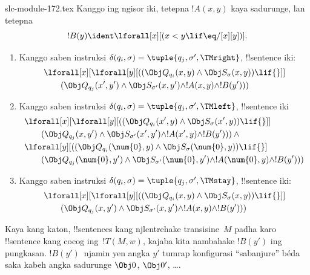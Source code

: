 \begin{filecontents*}[overwrite]{slc-module-172.tex}
Kanggo ing ngisor iki, tetepna $!A(x, y)$ kaya
sadurunge, lan tetepna
\[
  !B(y) \ident \lforall[x][(x < y \lif \eq/[x][y])].
\]
\begin{enumerate}
\item {} Kanggo saben instruksi
  $\delta(q_i, \sigma) = \tuple{q_j, \sigma', \TMright}$,
  !!{sentence} iki:
\begin{align*}
& \lforall[x][\lforall[y][(
   (\Obj Q_{q_i}(x, y) \land \Obj S_{\sigma}(x, y)) \lif {}]] \\
&\qquad   (\Obj Q_{q_j}(x', y') \land \Obj S_{\sigma'}(x, y') \land
!A(x, y) \land !B(y')))
\end{align*}
\item {} Kanggo saben instruksi
  $\delta(q_i, \sigma) = \tuple{q_j, \sigma', \TMleft}$,
  !!{sentence} iki
\begin{align*}
& \lforall[x][\lforall[y][
    ((\Obj Q_{q_i}(x', y) \land \Obj S_{\sigma}(x', y)) \lif {}]]\\
& \qquad   (\Obj Q_{q_j}(x, y') \land \Obj S_{\sigma'}(x', y') \land
!A(x', y) \land !B(y'))) \land {}\\
& \lforall[y][((\Obj Q_{q_i}(\num{0}, y) \land \Obj S_{\sigma}(\num{0},
    y)) \lif {}]\\
& \qquad (\Obj Q_{q_j}(\num{0}, y') \land \Obj S_{\sigma'}(\num{0},
  y') \land !A(\num{0}, y) \land !B(y')))
\end{align*}
\item {} Kanggo saben instruksi
  $\delta(q_i, \sigma) = \tuple{q_j, \sigma', \TMstay}$,
  !!{sentence} iki:
\begin{align*}
& \lforall[x][\lforall[y][(
   (\Obj Q_{q_i}(x, y) \land \Obj S_{\sigma}(x, y)) \lif {}]] \\
&\qquad (\Obj Q_{q_j}(x, y') \land \Obj S_{\sigma'}(x, y') \land
!A(x, y) \land !B(y')))
\end{align*}
\end{enumerate}
Kaya kang katon, !!{sentence}s kang njlentrehake
transisine~$M$ padha karo !!{sentence} kang cocog
ing~$!T(M,w)$, kajaba kita nambahake $!B(y')$
ing pungkasan. $!B(y')$~njamin yen angka $y'$
tumrap konfigurasi ``sabanjure'' béda saka kabeh
angka sadurunge $\Obj 0$, $\Obj 0'$, \dots.

\end{filecontents*}
